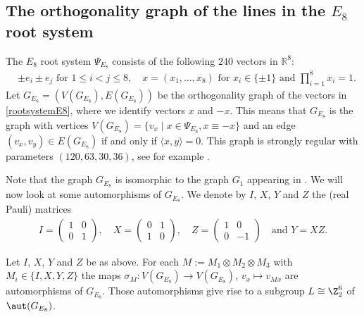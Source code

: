 \subsection[Orthogonality graph]{The orthogonality graph of the lines in the \texorpdfstring{$E_8$}{E8} root system}

\begin{defi}\label{defGE8}
The $E_8$ root system $\Psi_{E_8}$ consists of the following $240$ vectors in $\mathbb{R}^8$:
\begin{align}\label{rootsystemE8}
&\pm e_i \pm e_j \text{ for } 1 \leq i<j \leq 8, \quad  x=(x_1,\dots,x_8) \text{ for } x_i \in \{\pm 1\} \text{ and } \prod_{i=1}^8 x_i=1.
\end{align}
Let $G_{E_8}=(V(G_{E_8}), E(G_{E_8}))$ be the orthogonality graph of the vectors in \eqref{rootsystemE8}, where we identify vectors $x$ and $-x$. This means that $G_{E_8}$ is the graph with vertices $V(G_{E_8})=\{v_x \mid x \in \Psi_{E_8}, x \equiv-x\}$ and an edge $(v_x,v_y)\in E(G_{E_8})$ if and only if $\langle x, y\rangle=0$. This graph is strongly regular with parameters $(120, 63, 30, 36)$, see for example \cite[Section 10.39]{BVM}. \end{defi}

Note that the graph $G_{E_8}$ is isomorphic to the graph $G_1$ appearing in \cite[Table 2.2]{MS}. We will now look at some automorphisms of $G_{E_8}$.
We denote by $I$, $X$, $Y$ and $Z$ the (real Pauli) matrices 
\begin{align}\label{Pauli}
I=\begin{pmatrix}1&0\\0&1\end{pmatrix},\quad
X=\begin{pmatrix}0&1\\1&0\end{pmatrix},\quad Z=\begin{pmatrix}1&0\\0&-1\end{pmatrix} \quad\text{and } Y=XZ.
\end{align}

\begin{lemm}\label{Lsubgroup}
Let $I$, $X$, $Y$ and $Z$ be as above. For each $M:=M_1\otimes M_2 \otimes M_3$ with $M_i \in \{I,X,Y,Z\}$ the maps $\sigma_M:V(G_{E_8})\to V(G_{E_8})$, $v_x \mapsto v_{Mx}$ are automorphisms of $G_{E_8}$. Those automorphisms give rise to a  subgroup $L \cong \Z_2^6$ of $\aut(G_{E_8})$.
\end{lemm}

